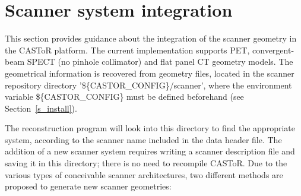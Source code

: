 \documentclass[a4paper, 11pt]{article}
\begin{document}
  







\newpage
\section{Scanner system integration}
\label{s_scanner_integration}

This section provides guidance about the integration of the scanner geometry in the CASToR platform. 
The current implementation supports PET, convergent-beam SPECT (no pinhole collimator) and flat panel CT geometry models.
The geometrical information is recovered from geometry files, located in the scanner repository directory '\$\{CASTOR\_CONFIG\}/scanner', 
where the environment variable \$\{CASTOR\_CONFIG\} must be defined beforehand (see Section~\ref{s_install}).

The reconstruction program will look into this directory to find the appropriate system, according to the scanner name included in the data header file. 
The addition of a new scanner system requires writing a scanner description file and saving it in this directory; there is no need to recompile CASToR.
Due to the various types of conceivable scanner architectures, two different methods are proposed to generate new scanner geometries:
\end{document}
